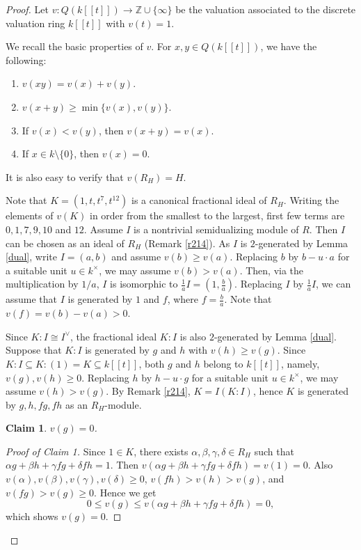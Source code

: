 \documentclass{amsart}
\theoremstyle{plain}
\newtheorem{claim}[]{Claim}
\theoremstyle{definition}
\numberwithin{theorem}{section}
\numberwithin{equation}{section}
\numberwithin{equation}{theorem}
\begin{document}
\begin{proof}
Let $v \colon Q(k[\![t]\!]) \to \mathbb{Z} \cup\{\infty\}$ be the valuation associated to the discrete valuation ring $k[\![t]\!]$ with $v(t)=1$.

We recall the basic properties of $v$.
For $x,y\in Q(k[\![t]\!])$, we have the following:
\begin{enumerate}
\item $v(xy)=v(x)+v(y)$.
\item $v(x+y) \ge \min\{v(x),v(y)\}$.
\item If $v(x)<v(y)$, then $v(x+y)=v(x)$.
\item If $x\in k\setminus\{0\}$, then $v(x)=0$.
\end{enumerate}
It is also easy to verify that $v(R_H)=H$.

Note that $K=(1,t,t^7,t^{12})$ is a canonical fractional ideal of $R_H$.
Writing the elements of $v(K)$ in order from the smallest to the largest, first few terms are $0,1,7,9,10$ and $12$.
Assume $I$ is a nontrivial semidualizing module of $R$.
Then $I$ can be chosen as an ideal of $R_H$ (Remark \ref{r214}).
As $I$ is $2$-generated by Lemma \ref{dual}, write $I=(a,b)$ and assume $v(b)\ge v(a)$.
Replacing $b$ by $b-u\cdot a$ for a suitable unit $u\in k^\times$, we may assume $v(b)>v(a)$.
Then, via the multiplication by $1/a$, $I$ is isomorphic to $\frac{1}{a}I=(1,\frac{b}{a})$.
Replacing $I$ by $\frac{1}{a}I$, we can assume that $I$ is generated by $1$ and $f$, where $f=\frac{b}{a}$.
Note that $v(f)=v(b)-v(a)>0$.

Since $K:I \cong I^\vee$, the fractional ideal $K:I$ is also $2$-generated by Lemma \ref{dual}.
Suppose that $K:I$ is generated by $g$ and $h$ with $v(h)\ge v(g)$.
Since $K:I \subseteq K: (1)=K \subseteq k[\![t]\!]$, both $g$ and $h$ belong to $k[\![t]\!]$, namely, $v(g),v(h) \ge 0$.
Replacing $h$ by $h-u\cdot g$ for a suitable unit $u\in k^\times$, we may assume $v(h)>v(g)$.
By Remark \ref{r214}, $K=I(K:I)$, hence $K$ is generated by $g,h,fg,fh$ as an $R_H$-module.

\begin{claim} 
$v(g)=0$.
\end{claim}

\begin{proof}[Proof of Claim 1]
Since $1\in K$, there exists $\alpha,\beta,\gamma,\delta \in R_H$ such that $\alpha g+\beta h+ \gamma fg +\delta fh=1$.
Then $v(\alpha g+\beta h+ \gamma fg +\delta fh)=v(1)=0$.
Also $v(\alpha),v(\beta),v(\gamma), v(\delta) \ge 0$, $v(fh)>v(h)>v(g)$, and $v(fg)>v(g)\ge 0$.
Hence we get 
\[
0 \le v(g) \le v(\alpha g+\beta h+ \gamma fg +\delta fh)=0,
\]
which shows $v(g)=0$.
\end{proof}


\end{proof}
\end{document}

